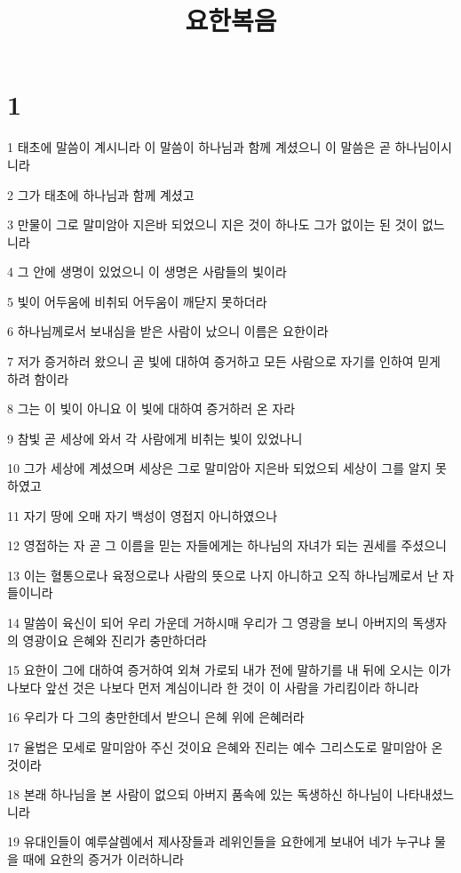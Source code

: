 

\title{요한복음}


\chapter{1}

\par 1 태초에 말씀이 계시니라 이 말씀이 하나님과 함께 계셨으니 이 말씀은 곧 하나님이시니라
\par 2 그가 태초에 하나님과 함께 계셨고
\par 3 만물이 그로 말미암아 지은바 되었으니 지은 것이 하나도 그가 없이는 된 것이 없느니라
\par 4 그 안에 생명이 있었으니 이 생명은 사람들의 빛이라
\par 5 빛이 어두움에 비취되 어두움이 깨닫지 못하더라
\par 6 하나님께로서 보내심을 받은 사람이 났으니 이름은 요한이라
\par 7 저가 증거하러 왔으니 곧 빛에 대하여 증거하고 모든 사람으로 자기를 인하여 믿게 하려 함이라
\par 8 그는 이 빛이 아니요 이 빛에 대하여 증거하러 온 자라
\par 9 참빛 곧 세상에 와서 각 사람에게 비취는 빛이 있었나니
\par 10 그가 세상에 계셨으며 세상은 그로 말미암아 지은바 되었으되 세상이 그를 알지 못하였고
\par 11 자기 땅에 오매 자기 백성이 영접지 아니하였으나
\par 12 영접하는 자 곧 그 이름을 믿는 자들에게는 하나님의 자녀가 되는 권세를 주셨으니
\par 13 이는 혈통으로나 육정으로나 사람의 뜻으로 나지 아니하고 오직 하나님께로서 난 자들이니라
\par 14 말씀이 육신이 되어 우리 가운데 거하시매 우리가 그 영광을 보니 아버지의 독생자의 영광이요 은혜와 진리가 충만하더라
\par 15 요한이 그에 대하여 증거하여 외쳐 가로되 내가 전에 말하기를 내 뒤에 오시는 이가 나보다 앞선 것은 나보다 먼저 계심이니라 한 것이 이 사람을 가리킴이라 하니라
\par 16 우리가 다 그의 충만한데서 받으니 은혜 위에 은혜러라
\par 17 율법은 모세로 말미암아 주신 것이요 은혜와 진리는 예수 그리스도로 말미암아 온 것이라
\par 18 본래 하나님을 본 사람이 없으되 아버지 품속에 있는 독생하신 하나님이 나타내셨느니라
\par 19 유대인들이 예루살렘에서 제사장들과 레위인들을 요한에게 보내어 네가 누구냐 물을 때에 요한의 증거가 이러하니라
